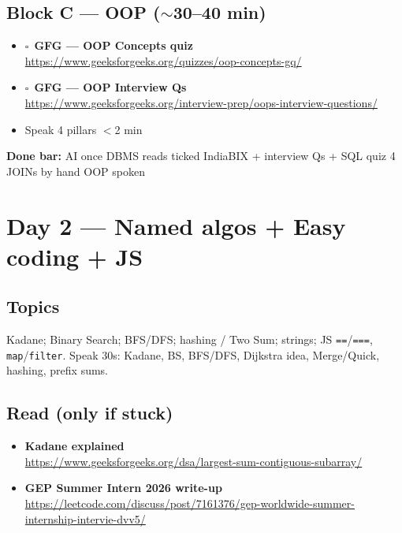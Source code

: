 \documentclass[a4paper,9pt]{extarticle}
\newcommand{\tick}{$\square$\ }
\newcommand{\Res}[2]{\textbf{#1}\\{\footnotesize\url{#2}}}
\begin{document}
\subsection{Block C --- OOP ($\sim$30--40 min)}
\begin{itemize}
  \item \tick \Res{GFG --- OOP Concepts quiz}{https://www.geeksforgeeks.org/quizzes/oop-concepts-gq/}
  \item \tick \Res{GFG --- OOP Interview Qs}{https://www.geeksforgeeks.org/interview-prep/oops-interview-questions/}
  \item Speak 4 pillars $<$2 min
\end{itemize}

\noindent\textbf{Done bar:} AI once \textbar{} DBMS reads ticked \textbar{} IndiaBIX + interview Qs + SQL quiz \textbar{} 4 JOINs by hand \textbar{} OOP spoken

\section{Day 2 --- Named algos + Easy coding + JS}
\subsection{Topics}
Kadane; Binary Search; BFS/DFS; hashing / Two Sum; strings; JS \texttt{==}/\texttt{===}, \texttt{map}/\texttt{filter}.
Speak 30s: Kadane, BS, BFS/DFS, Dijkstra idea, Merge/Quick, hashing, prefix sums.

\subsection{Read (only if stuck)}
\begin{itemize}
  \item \Res{Kadane explained}{https://www.geeksforgeeks.org/dsa/largest-sum-contiguous-subarray/}
  \item \Res{GEP Summer Intern 2026 write-up}{https://leetcode.com/discuss/post/7161376/gep-worldwide-summer-internship-intervie-dvv5/}
\end{itemize}
\end{document}
